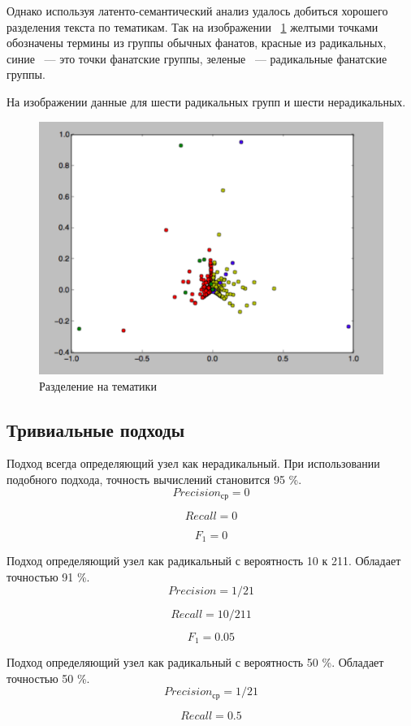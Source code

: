 \documentclass[annotation,times,page4]{itmo-student-thesis}
\begin{document}
Однако используя латенто-семантический анализ удалось добиться хорошего разделения текста по тематикам. Так на изображении ~\ref{fig:sem} желтыми точками обозначены термины из группы обычных фанатов, красные из радикальных, синие ~--- это точки фанатские группы, зеленые ~--- радикальные фанатские группы. 

На изображении данные для шести радикальных групп и шести нерадикальных. 
\begin{figure}[!h]
\caption{Разделение на тематики}
\label{fig:sem}
\centering
\includegraphics[width=\textwidth]{figs/sem.pdf}
\end{figure}

\newpage
\subsection{Тривиальные подходы}
Подход всегда определяющий узел как нерадикальный. 
При использовании подобного подхода, точность вычислений становится 95 \%. 
\[
    Precision_{ср} = 0 
\] 

\[
    Recall = 0  
\] 

\[
    F_{1} = 0  
\] 


Подход определяющий узел как радикальный с вероятность 10 к 211. Обладает точностью 91 \%.
\[
    Precision = 1 / 21 
\] 

\[
    Recall = 10 / 211  
\] 

\[
    F_{1} = 0.05  
\] 

Подход определяющий узел как радикальный с вероятность 50 \%. Обладает точностью 50 \%.
\[ 
    Precision_{ср} = 1 / 21
\] 

\[
    Recall = 0.5  
\] 
\end{document}
